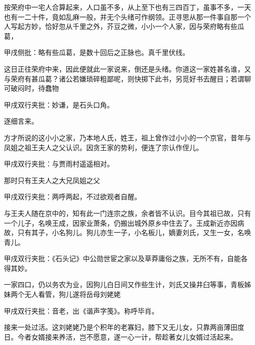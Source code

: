 \begin{parag}


    按荣府中一宅人合算起来，人口虽不多，从上至下也有三四百丁，虽事不多，一天也有一二十件，竟如乱麻一般，并无个头绪可作纲领。正寻思从那一件事自那一个人写起方妙，恰好忽从千里之外，芥豆之微，小小一个人家，因与荣府略有些瓜葛，\begin{note}甲戌侧批：略有些瓜葛，是数十回后之正脉也。真千里伏线。 \end{note}这日正往荣府中来，因此便就此一家说来，倒还是头绪。你道这一家姓甚名谁，又与荣府有甚瓜葛？诸公若嫌琐碎粗鄙呢，则快掷下此书，另觅好书去醒目；若谓聊可破闷时，待蠢物\begin{note}甲戌双行夹批：妙谦，是石头口角。\end{note}逐细言来。
\end{parag}


\begin{parag}


    方才所说的这小小之家，乃本地人氏，姓王，祖上曾作过小小的一个京官，昔年与凤姐之祖王夫人之父认识。因贪王家的势利，便连了宗认作侄儿。\begin{note}甲戌双行夹批：与贾雨村遥遥相对。\end{note}那时只有王夫人之大兄凤姐之父\begin{note}甲戌双行夹批：两呼两起，不过欲观者自醒。\end{note}与王夫人随在京中的，知有此一门连宗之族，余者皆不认识。目今其祖已故，只有一个儿子，名唤王成，因家业萧条，仍搬出城外原乡中住去了。王成新近亦因病故，只有其子，小名狗儿。狗儿亦生一子，小名板儿，嫡妻刘氏，又生一女，名唤青儿。\begin{note}甲戌双行夹批：《石头记》中公勋世宦之家以及草莽庸俗之族，无所不有，自能各得其妙。\end{note}一家四口，仍以务农为业，因狗儿白日间又作些生计，刘氏又操井臼等事，青板姊妹两个无人看管，狗儿遂将岳母刘姥姥\begin{note}甲戌双行夹批：音老，出《谐声字笺》。称呼毕肖。\end{note}接来一处过活。这刘姥姥乃是个积年的老寡妇，膝下又无儿女，只靠两亩薄田度日。今者女婿接来养活，岂不愿意，遂一心一计，帮趁著女儿女婿过活起来。
\end{parag}



